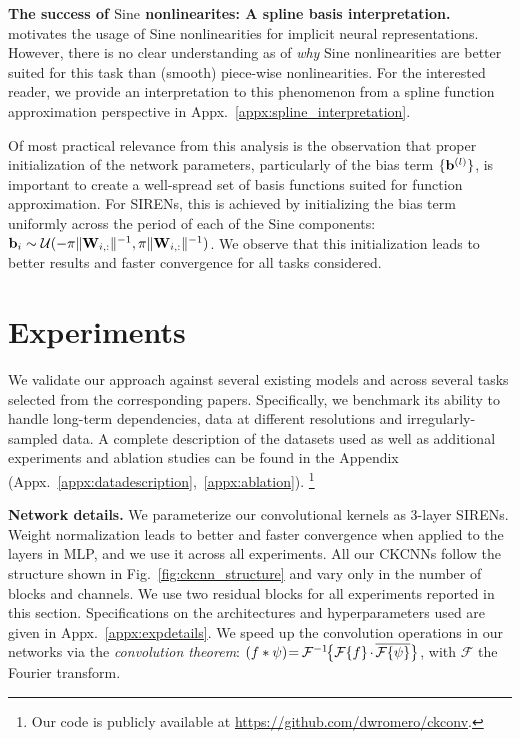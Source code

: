 \documentclass{article}
\newcommand{\mat}[1]{\ensuremath{{\mathbf{\MakeUppercase{{#1}}}}}}
\renewcommand{\vec}[1]{\ensuremath{\mathbf{\MakeLowercase{{#1}}}}}
\newcommand{\Wm}{\mat{W}}
\newcommand{\bv}{\vec{b}}
\newcommand{\mlp}{{\btt MLP}}
\begin{document}
\textbf{The success of $\mathrm{Sine}$ nonlinearites: A spline basis interpretation.} \citet{sitzmann2020implicit} motivates the usage of Sine nonlinearities for implicit neural representations. However, there is no clear understanding as of \textit{why} Sine nonlinearities are better suited for this task than (smooth) piece-wise nonlinearities. For the interested reader, we provide an interpretation to this phenomenon from a spline function approximation perspective in Appx.~\ref{appx:spline_interpretation}.

Of most practical relevance from this analysis is the observation that proper initialization of the network parameters, particularly of the bias term $\{\bv^{(l)}\}$, is important to create a well-spread set of basis functions suited for function approximation. For SIRENs, this is achieved by initializing the bias term uniformly across the period of each of the $\mathrm{Sine}$ components: $\bv_{i} \sim \mathcal{U}(-\pi \| \Wm_{i,:}\|^{-1},\pi \| \Wm_{i,:}\|^{-1})$. We observe that this initialization leads to better results and faster convergence for all tasks considered.

\vspace{-2.5mm}
\section{Experiments}\label{sec:experiments}
\vspace{-2mm}
We validate our approach against several existing models and across several tasks selected from the corresponding papers. Specifically, we benchmark its ability to handle long-term dependencies, data at different resolutions and irregularly-sampled data. A complete description of the datasets used as well as additional experiments and ablation studies can be found in the Appendix (Appx.~\ref{appx:datadescription},~\ref{appx:ablation}).
\footnote{Our code is publicly available at \url{https://github.com/dwromero/ckconv}.}

\textbf{Network details.} We parameterize our convolutional kernels as 3-layer SIRENs. Weight normalization \citep{salimans2016weight} leads to better and faster convergence when applied to the layers in \mlp, and we use it across all experiments. All our CKCNNs follow the structure shown in Fig.~\ref{fig:ckcnn_structure} and vary only in the number of blocks and channels. We use two residual blocks for all experiments reported in this section. Specifications on the architectures and hyperparameters used are given in Appx.~\ref{appx:expdetails}.
We speed up the convolution operations in our networks via the \textit{convolution theorem}: $(f * \psi)\hspace{-0.7mm} = \hspace{-0.3mm}\mathcal{F}^{-1}\hspace{-0.5mm}\big\{\mathcal{F}\{f\} \hspace{-0.3mm}\cdot\hspace{-0.3mm} \overline{\mathcal{F}\{\psi\}}\big\}$, with $\mathcal{F}$ the Fourier transform.
\end{document}
